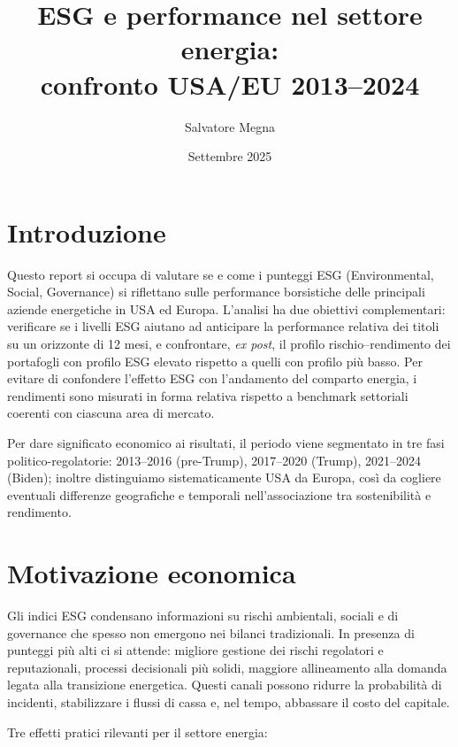 \documentclass[12pt,a4paper]{article}
\title{
    \textbf{
        ESG e performance nel settore energia:\\
        confronto USA/EU 2013--2024
    }
}
\author{Salvatore Megna}
\date{Settembre 2025}
\begin{document}
\maketitle

\section{Introduzione}

Questo report si occupa di valutare se e come i punteggi ESG (Environmental, Social, Governance) si riflettano sulle performance borsistiche delle principali aziende energetiche in USA ed Europa. L'analisi ha due obiettivi complementari: verificare se i livelli ESG aiutano ad anticipare la performance relativa dei titoli su un orizzonte di 12 mesi, e confrontare, \textit{ex post}, il profilo rischio--rendimento dei portafogli con profilo ESG elevato rispetto a quelli con profilo più basso. Per evitare di confondere l'effetto ESG con l'andamento del comparto energia, i rendimenti sono misurati in forma relativa rispetto a benchmark settoriali coerenti con ciascuna area di mercato.

Per dare significato economico ai risultati, il periodo viene segmentato in tre fasi politico-regolatorie: 2013--2016 (pre-Trump), 2017--2020 (Trump), 2021--2024 (Biden); inoltre distinguiamo sistematicamente USA da Europa, così da cogliere eventuali differenze geografiche e temporali nell'associazione tra sostenibilità e rendimento.

\section{Motivazione economica}

Gli indici ESG condensano informazioni su rischi ambientali, sociali e di governance che spesso non emergono nei bilanci tradizionali. In presenza di punteggi più alti ci si attende: migliore gestione dei rischi regolatori e reputazionali, processi decisionali più solidi, maggiore allineamento alla domanda legata alla transizione energetica. Questi canali possono ridurre la probabilità di incidenti, stabilizzare i flussi di cassa e, nel tempo, abbassare il costo del capitale.

Tre effetti pratici rilevanti per il settore energia:
\end{document}
